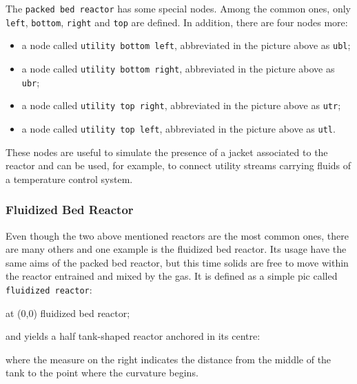 \documentclass[12pt]{article}						%
\newcommand*{\chpn}[1]{\texttt{#1}}				%
\newcommand*{\chpp}[1]{\texttt{#1}}				%
\begin{document}
The \chpp{packed bed reactor} has some special nodes. Among the common ones,
only \chpn{left}, \chpn{bottom}, \chpn{right} and \chpn{top} are defined. In
addition, there are four nodes more:
\begin{itemize}
	\item a node called \chpn{utility bottom left}, abbreviated in the picture
		above as \chpn{ubl};
	\item a node called \chpn{utility bottom right}, abbreviated in the picture
		above as \chpn{ubr};
	\item a node called \chpn{utility top right}, abbreviated in the picture
		above as \chpn{utr};
	\item a node called \chpn{utility top left}, abbreviated in the picture above
		as \chpn{utl}.
\end{itemize}
These nodes are useful to simulate the presence of a jacket associated to the
reactor and can be used, for example, to connect utility streams carrying fluids
of a temperature control system.

\subsubsection{Fluidized Bed Reactor}

Even though the two above mentioned reactors are the most common ones, there are
many others and one example is the fluidized bed reactor. Its usage have the same
aims of the packed bed reactor, but this time solids are free to move within
the reactor entrained and mixed by the gas. It is defined as a simple pic called
\chpp{fluidized reactor}:
\begin{chpcode}
	\pic at (0,0) {fluidized bed reactor};
\end{chpcode}
and yields a half tank-shaped reactor anchored in its centre:
\begin{center}
\end{center}
where the measure on the right indicates the distance from the middle of the tank
to the point where the curvature begins.
\end{document}
